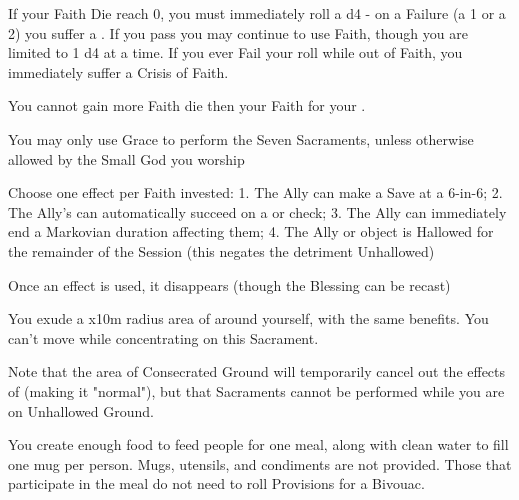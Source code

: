 {If your Faith Die reach 0, you must immediately roll a d4 - on a Failure (a 1 or a 2) you suffer a .  If you pass you may continue to use Faith, though you are limited to 1 d4 at a time.  If you ever Fail your roll while out of Faith, you immediately suffer a Crisis of Faith. 

You cannot gain more Faith die then your \MAX Faith for your \LVL.


You may only use Grace to perform the Seven Sacraments, unless otherwise allowed by the Small God you worship

\LITURGY [
  Name=Bless,
  Link=mystic-sacrament-bless,
  Paradigm=Grace,
  Save=N,
  Duration=Session,
  Counter=n/a,
  Keywords=Splittable,
  Target=Close Ally or object
]



Choose one effect per Faith invested: 
1. The Ally can make a Save at a 6-in-6; 
2. The Ally's can automatically succeed on a \RO or \RS check;
3. The Ally can immediately end a Markovian duration affecting them;
4. The Ally or object is Hallowed for the remainder of the Session (this negates the detriment Unhallowed)

Once an effect is used, it disappears (though the Blessing can be recast)


\LITURGY [
  Name=Consecrate,
  Link=mystic-sacrament-consecrate,
  Paradigm=Grace,
  Save=N,
  Duration=Concentration,
  Counter=n/a,
  Keywords=None,
  Target=Close radius
]

You exude a \DICE x10m radius area of  around yourself, with the same benefits.  You can't move while concentrating on this Sacrament.

Note that the area of Consecrated Ground will temporarily cancel out the effects of  (making it "normal"), but that Sacraments cannot be performed while you are on Unhallowed Ground.

\LITURGY [
  Name=Create Food,
  Link=mystic-sacrament-create-food,
  Paradigm=Grace,
  Save=N,
  Duration=0,
  Counter=n/a,
  Keywords=None,
  Target=Close radius
]


You create enough food to feed \SUMDICE people for one meal, along with clean water to fill one mug per person. Mugs, utensils, and condiments are not provided.  Those that participate in the meal do not need to roll Provisions for a Bivouac.  

}
